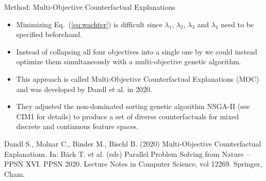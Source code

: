\documentclass[11pt,compress,t,notes=noshow, xcolor=table]{beamer}
\begin{document}
\begin{vbframe}{Method: Multi-Objective Counterfactual Explanations}
	\begin{itemize}
		\item Minimizing Eq.~(\ref{eq:wachter}) is difficult since $\lambda_1$, $\lambda_2$, $\lambda_3$ and $\lambda_4$ need to be specified beforehand. 
		\item Instead of collapsing all four objectives into a single one by we could instead optimize them simultaneously with a multi-objective genetic algorithm. 
		\item This approach is called Multi-Objective Counterfactual Explanations (MOC) and was developed by Dandl et al. in 2020. 
		\item They adjusted the non-dominated sorting genetic algorithm NSGA-II (see CIM1 for details) to produce a set of diverse counterfactuals for mixed discrete and continuous feature spaces.
	\end{itemize}

	\tiny{Dandl S., Molnar C., Binder M., Bischl B. (2020) Multi-Objective Counterfactual Explanations. In: Bäck T. et al. (eds) Parallel Problem Solving from Nature – PPSN XVI. PPSN 2020. Lecture Notes in Computer Science, vol 12269. Springer, Cham.}
	 
\end{vbframe}
\end{document}
